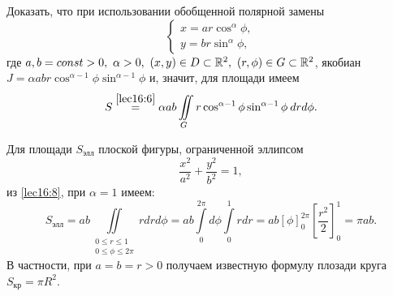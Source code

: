 \documentclass[../../main.tex]{subfiles}
\begin{document}
\begin{exercise}
	Доказать, что при использовании обобщенной полярной замены
	\begin{equation*}
	\begin{cases}
	x=ar\cos^\alpha\phi,\\
	y=br\sin^\alpha\phi,
	\end{cases}
	\end{equation*}
	где $
	a,b=const>0,\
	\alpha>0,\ (x,y)\in D \subset \mathbb{R}^2,\ (r,\phi)\in G\subset \mathbb{R}^2$,
	якобиан $J=\alpha a b r \cos^{\alpha-1}\phi\sin^{\alpha-1}\phi$ и, значит, 
	для 
	площади имеем
	\begin{equation}
	\label{lec16:8}
	S \overset{\eqref{lec16:6}}{=} \alpha a b \iint\limits_G r\cos^{\alpha - 1}\phi
	\sin^{\alpha - 1}\phi \: dr d\phi.
	\end{equation}
\end{exercise}
	\begin{example}
	Для площади $S_{\text{элл}}$ плоской фигуры, ограниченной эллипсом
	\begin{equation*}
	\dfrac{x^2}{a^2} + \dfrac{y^2}{b^2} = 1,
	\end{equation*}
	из \eqref{lec16:8}, при
	$ \alpha = 1 $ имеем:
	\begin{equation*}
	S_{\text{элл}} = 
	ab\iint\limits_
	{\substack{
		0\leq r\leq1\\
		0\leq \phi \leq 2\pi
	}} rdrd \phi =
	ab \int\limits_0^{2\pi}d\phi\int\limits_0^1rdr =
	ab \left[\phi \right]^{2\pi}_0
	\left[\dfrac{r^2}{2}\right]_0^1 = \pi ab.
	\end{equation*}
	В частности, при $a = b = r > 0$ получаем известную формулу плозади круга 
	$S_{\text{кр}} = \pi R^2$.
\end{example}
\end{document}
